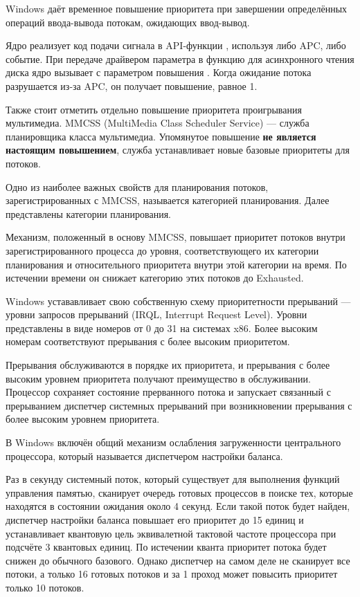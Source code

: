 Windows даёт временное повышение приоритета при завершении определённых
операций ввода-вывода потокам, ожидающих ввод-вывод.


Ядро реализует код подачи сигнала в API-функции ,
используя либо APC, либо событие. При передаче драйвером параметра 
в функцию 
для асинхронного чтения диска ядро вызывает  
с параметром повышения . Когда ожидание потока 
разрушается из-за APC, он получает повышение, равное 1.

Также стоит отметить отдельно повышение приоритета проигрывания
мультимедиа. MMCSS (MultiMedia Class Scheduler Service) --- 
служба планировщика класса мультимедиа. Упомянутое повышение 
\textbf{не является настоящим повышением}, служба устанавливает
новые базовые приоритеты для потоков. 

Одно из наиболее важных свойств для планирования потоков, 
зарегистрированных с MMCSS, называется
категорией планирования. Далее представлены категории планирования.


Механизм, положенный в основу MMCSS, повышает приоритет потоков
внутри зарегистрированного процесса до уровня, соответствующего 
их категории планирования и относительного приоритета внутри этой 
категории на время. По истечении времени он снижает категорию 
этих потоков до Exhausted.

Windows устававливает свою собственную схему приоритетности 
прерываний --- уровни запросов прерываний (IRQL, Interrupt Request Level).
Уровни представлены в виде номеров от 0 до 31 на системах x86. Более высоким номерам 
соответствуют прерывания с более высоким приоритетом.


Прерывания обслуживаются в порядке их приоритета, и прерывания с более 
высоким уровнем приоритета получают преимущество в обслуживании. Процессор
сохраняет состояние прерванного потока и запускает связанный 
с прерыванием диспетчер системных прерываний при возникновении прерывания
с более высоким уровнем приоритета. 

В Windows включён общий механизм ослабления загруженности центрального 
процессора, который называется диспетчером настройки баланса.

Раз в секунду системный поток, который существует для выполнения 
функций управления памятью, сканирует очередь готовых процессов в 
поиске тех, которые находятся в состоянии ожидания около 4 секунд. Если
такой поток будет найден, диспетчер настройки баланса повышает его 
приоритет до 15 единиц и устанавливает квантовую цель эквивалетной
тактовой частоте процессора при подсчёте 3 квантовых единиц. По истечении
кванта приоритет потока будет снижен до обычного базового. Однако
диспетчер на самом деле не сканирует все потоки, а только 16 готовых 
потоков и за 1 проход может повысить приоритет только 10 потоков.
